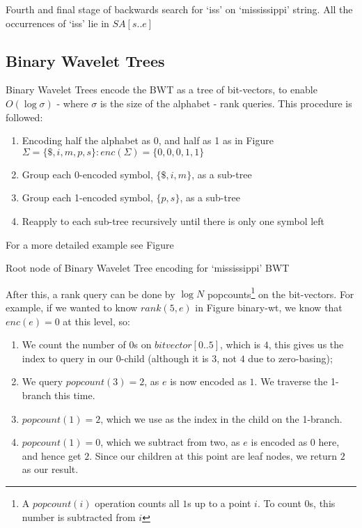 			{Fourth and final stage of backwards search for `iss' on
			`mississippi' string. All the occurrences of `iss' lie in
			$SA[s..e]$}
		\newpage


\subsection{Binary Wavelet Trees}
Binary Wavelet Trees encode the BWT as a tree of bit-vectors, to enable
$O(\log \sigma)$ - where $\sigma$ is the size of the alphabet - rank queries. This procedure is followed:

\begin{enumerate}
    \item
		Encoding half the alphabet as 0, and half as 1 as in Figure
    	$\Sigma = \{ \$, i, m, p, s \} : enc(\Sigma) = \{ 0, 0, 0, 1, 1 \}$
    \item
		Group each 0-encoded symbol, $\{ \$, i, m \}$, as a sub-tree
    \item
		Group each 1-encoded symbol, $\{ p, s \}$, as a sub-tree
    \item
		Reapply to each sub-tree recursively until there is only one symbol
    	left
\end{enumerate}

For a more detailed example see Figure %


			{Root node of Binary Wavelet Tree encoding for `mississippi' BWT}


After this, a rank query can be done by $\log N$ popcounts\footnote{A
$popcount(i)$ operation counts all $1$s up to a point $i$. To count $0$s, this
number is subtracted from $i$} on the bit-vectors. For example, if we wanted to 
know $rank(5, e)$ in Figure binary-wt, we know that $enc(e) = 0$ at this level, so:

\begin{enumerate}
    \item
		We count the number of $0$s on $bitvector[0..5]$, which is $4$, this
   		gives us the index to query in our 0-child (although it is $3$, not $4$ 
		due to zero-basing);
    \item
		We query $popcount(3) = 2$, as $e$ is now encoded as $1$. We traverse
    	the 1-branch this time.
    \item
		$popcount(1) = 2$, which we use as the index in the child on the
    	1-branch.
    \item
		$popcount(1) = 0$, which we subtract from two, as $e$ is encoded as
    	$0$ here, and hence get $2$. Since our children at this point are leaf
    	nodes, we return $2$ as our result.
\end{enumerate}

